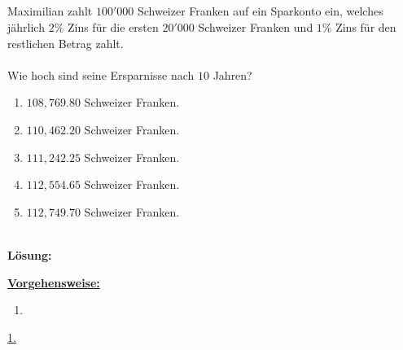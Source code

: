 \newpage

\subsection*{}
Maximilian zahlt $100'000$ Schweizer Franken auf ein Sparkonto ein, welches jährlich $2 \%$ Zins für die ersten $20'000$ Schweizer Franken und $1 \%$ Zins für den restlichen Betrag zahlt.\\
\\
Wie hoch sind seine Ersparnisse nach $10 $ Jahren?
\renewcommand{\labelenumi}{(\alph{enumi})}
\begin{enumerate}
	\item
	$108,769.80$ Schweizer Franken.
	\item
	$110,462.20$ Schweizer Franken.	
	\item 
	$111,242.25$ Schweizer Franken.
	\item
	$112,554.65$ Schweizer Franken.
	\item
	$112,749.70$ Schweizer Franken.
\end{enumerate}
\ \\
\textbf{Lösung:}
\begin{mdframed}
\underline{\textbf{Vorgehensweise:}}
\renewcommand{\labelenumi}{\theenumi.}
\begin{enumerate}
\item 
\end{enumerate}
\end{mdframed}

\underline{1. }\\

\newpage

